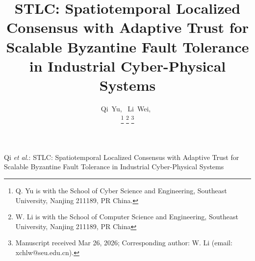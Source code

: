 \documentclass[lettersize,journal]{IEEEtran}
\begin{document}
\title{STLC: Spatiotemporal Localized Consensus with Adaptive Trust for Scalable Byzantine Fault Tolerance in Industrial Cyber-Physical Systems}

\author{Qi~Yu,~
	Li~Wei,~
	



\thanks{Q. Yu is with the School of Cyber Science and Engineering, Southeast University, Nanjing 211189, PR China.}
\thanks{W. Li is with the School of Computer Science and Engineering, Southeast University, Nanjing 211189, PR China}
\thanks{Manuscript received Mar 26, 2026; %
Corresponding author: W. Li (email: xchlw@seu.edu.cn).}
}

%
{Qi \MakeLowercase{\textit{et al.}}: STLC: Spatiotemporal Localized Consensus with Adaptive Trust for Scalable Byzantine Fault Tolerance in Industrial Cyber-Physical Systems}


\maketitle
\end{document}
